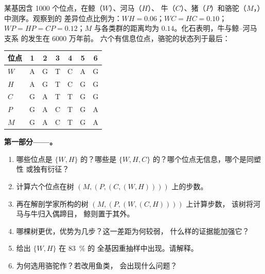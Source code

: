 \begin{problem}
\label{pb:b2:phylogenetic-trees:1}
某基因含 \num{1000} 个位点，在鲸（$W$）、河马（$H$）、
牛（$C$）、猪（$P$）和骆驼（$M$，）中测序。观察到的
差异位点比例为：$WH = 0.06$；$WC = HC = 0.10$；$WP =
HP = CP = 0.12$；$M$ 与各类群的距离均为 $0.14$。化石表明，牛与鲸–河马支系
的发生在 6000 万年前。
六个有信息位点，骆驼的状态列于最后：
\begin{center}
\begin{tabular}{l@{\quad}cccccc}
位点 & 1 & 2 & 3 & 4 & 5 & 6 \\ \hline
$W$ & A & G & T & C & A & G \\
$H$ & A & G & T & C & G & G \\
$C$ & G & A & T & T & G & G \\
$P$ & G & A & C & T & G & A \\
$M$ & G & A & C & T & G & A \\
\end{tabular}
\end{center}

\medskip
\noindent\textbf{第一部分——。}
\begin{enumerate}
  \item 哪些位点是 $\{W, H\}$ 的？哪些是 $\{W, H,
        C\}$ 的？哪个位点无信息，哪个是同塑性
        或独有衍征？
  \item 计算六个位点在树
        $(M,(P,(C,(W,H))))$ 上的步数。
  \item 再在解剖学家所构的树 $(M,(P,(W,(C,H))))$ 上计算步数，
        该树将河马与牛归入偶蹄目，
        鲸则置于其外。
  \item 哪棵树更优，优势为几步？这一差距为何较弱，
        什么样的证据能加强它？
  \item {}给出 $\{W, H\}$ 在 \qty{83}{\%} 的
        全基因重抽样中出现。请解释。
  \item 为何选用骆驼作？若改用鱼类，
        会出现什么问题？
\end{enumerate}


\end{problem}
